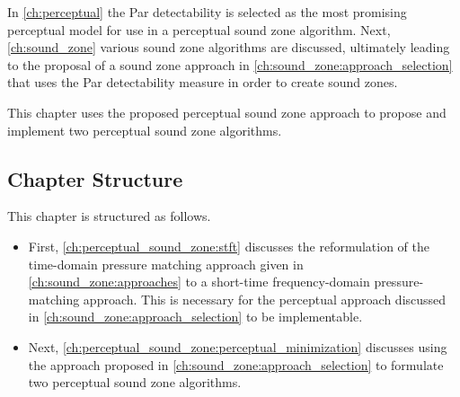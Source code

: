 In \autoref{ch:perceptual} the Par detectability is selected as the most promising perceptual model for use in a perceptual sound zone algorithm.
Next, \autoref{ch:sound_zone} various sound zone algorithms are discussed, ultimately leading to the proposal of a sound zone approach in 
\autoref{ch:sound_zone:approach_selection} that uses the Par detectability measure in order to create sound zones.

This chapter uses the proposed perceptual sound zone approach to propose and implement two perceptual sound zone algorithms.

\subsection*{Chapter Structure}
This chapter is structured as follows.
\begin{itemize}
    \item First, \autoref{ch:perceptual_sound_zone:stft} discusses the reformulation of the time-domain pressure matching approach given in 
        \autoref{ch:sound_zone:approaches} to a short-time frequency-domain pressure-matching approach.
        This is necessary for the perceptual approach discussed in \autoref{ch:sound_zone:approach_selection} to be implementable.
    \item Next, \autoref{ch:perceptual_sound_zone:perceptual_minimization} discusses using the approach proposed 
        in \autoref{ch:sound_zone:approach_selection} to formulate two perceptual sound zone algorithms.
\end{itemize}

